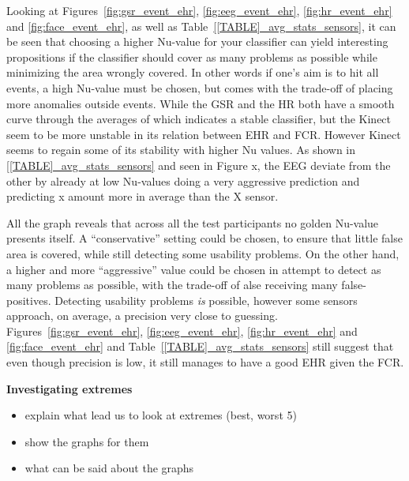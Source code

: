 Looking at Figures~\ref{fig:gsr_event_ehr}, \ref{fig:eeg_event_ehr}, \ref{fig:hr_event_ehr} and \ref{fig:face_event_ehr},
as well as Table~\ref{[TABLE]_avg_stats_sensors}, it can be seen that choosing a higher Nu-value for your classifier can yield interesting propositions if the classifier should cover as many problems as possible while minimizing the area wrongly covered.
In other words if one's aim is to hit all events, a high Nu-value must be chosen, but comes with the trade-off of placing more anomalies outside events. 
While the GSR and the HR both have a smooth curve through the averages of which indicates a stable classifier, but the Kinect seem to be more unstable in its relation between EHR and FCR. However Kinect seems to regain some of its stability with higher Nu values. As shown in \ref{[TABLE]_avg_stats_sensors} and seen in Figure x, the EEG deviate from the other by already at low Nu-values doing a very aggressive prediction and predicting x amount more in average than the X sensor.

All the graph reveals that across all the test participants no golden Nu-value presents itself. A ``conservative''
setting could be chosen, to ensure that little false area is covered, while still detecting some usability problems. On
the other hand, a higher and more ``aggressive'' value could be chosen in attempt to detect as many problems as
possible, with the trade-off of alse receiving many false-positives. Detecting usability problems \textit{is} possible,
however some sensors approach, on average, a precision very close to guessing.  Figures~\ref{fig:gsr_event_ehr},
\ref{fig:eeg_event_ehr}, \ref{fig:hr_event_ehr} and \ref{fig:face_event_ehr} and Table~\ref{[TABLE]_avg_stats_sensors}
still suggest that even though precision is low, it still manages to have a good EHR given the FCR.

\textbf{Investigating extremes}




\begin{itemize}
  \item explain what lead us to look at extremes (best, worst 5)
  \item show the graphs for them
  \item what can be said about the graphs
\end{itemize}